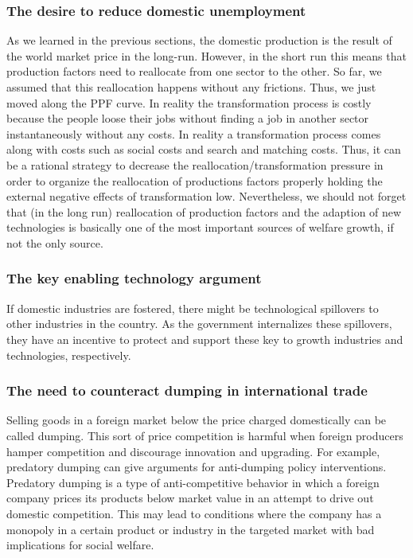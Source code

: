 \subsubsection*{The desire to reduce domestic unemployment}
As we learned in the previous sections, the domestic production is the result of the world market price in the long-run. However, in the short run this means that production factors need to reallocate from one sector to the other. So far, we assumed that this reallocation happens without any frictions. Thus, we just moved along the PPF curve. In reality the transformation process is costly because the people loose their jobs without finding a job in another sector instantaneously without any costs. In reality a transformation process comes along with costs such as social costs and search and matching costs. Thus, it can be a rational strategy to decrease the reallocation/transformation pressure in order to organize the reallocation of productions factors properly holding the external negative effects of transformation low. Nevertheless, we should not forget that (in the long run) reallocation of production factors and the adaption of new technologies is basically one of the most important sources of welfare growth, if not the only source.

\subsubsection*{The key enabling technology argument}
If domestic industries are fostered, there might be technological spillovers to other industries in the country. As the government internalizes these spillovers, they have an incentive to protect and support these key to growth industries and technologies, respectively.

\pbn

\subsubsection*{The need to counteract dumping in international trade}
Selling goods in a foreign market below the price charged domestically can be called dumping. This sort of price competition is harmful when foreign producers hamper competition and discourage innovation and upgrading. For example, predatory dumping can give arguments for anti-dumping policy interventions. Predatory dumping is a type of anti-competitive behavior in which a foreign company prices its products below market value in an attempt to drive out domestic competition. This may lead to conditions where the company has a monopoly in a certain product or industry in the targeted market with bad implications for social welfare. 



